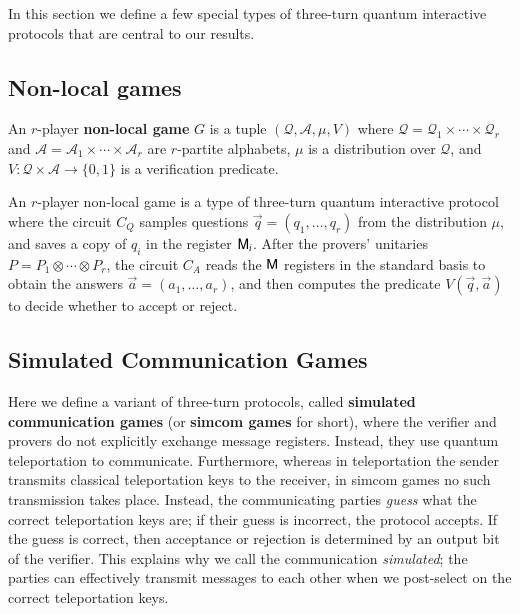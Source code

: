 In this section we define a few special types of three-turn quantum interactive protocols that are central to our results. 

\subsection{Non-local games} 
An $r$-player \textbf{non-local game} $G$ is a tuple $(\mathcal{Q},\mathcal{A},\mu,V)$ where $\mathcal{Q} = \mathcal{Q}_1 \times \cdots \times \mathcal{Q}_r$ and $\mathcal{A} = \mathcal{A}_1 \times \cdots \times \mathcal{A}_r$ are $r$-partite alphabets, $\mu$ is a distribution over $\mathcal{Q}$, and $V: \mathcal{Q} \times \mathcal{A} \to \{0,1\}$ is a verification predicate. 


An $r$-player non-local game is a type of three-turn quantum interactive protocol where the circuit $C_Q$ samples questions $\vec{q} = (q_1,\ldots,q_r)$ from the distribution $\mu$, and saves a copy of $q_i$ in the register ${\mathsf{M}}_i$. After the provers' unitaries $P = P_1 \otimes \cdots \otimes P_r$, the circuit $C_A$ reads the ${\mathsf{M}}$ registers in the standard basis to obtain the answers $\vec{a} = (a_1,\ldots,a_r)$, and then computes the predicate $V(\vec{q},\vec{a})$ to decide whether to accept or reject.


\subsection{Simulated Communication Games}

Here we  define a variant of three-turn protocols, called \textbf{simulated communication games} (or \textbf{simcom games} for short), where the verifier and provers do not explicitly exchange message registers. Instead, they use quantum teleportation to communicate. Furthermore, whereas in teleportation the sender transmits classical teleportation keys to the receiver, in simcom games no such transmission takes place. Instead, the communicating parties \emph{guess} what the correct teleportation keys are; if their guess is incorrect, the protocol accepts. If the guess is correct, then acceptance or rejection is determined by an output bit of the verifier. This explains why we call the communication \emph{simulated}; the parties can effectively transmit messages to each other when we post-select on the correct teleportation keys.

